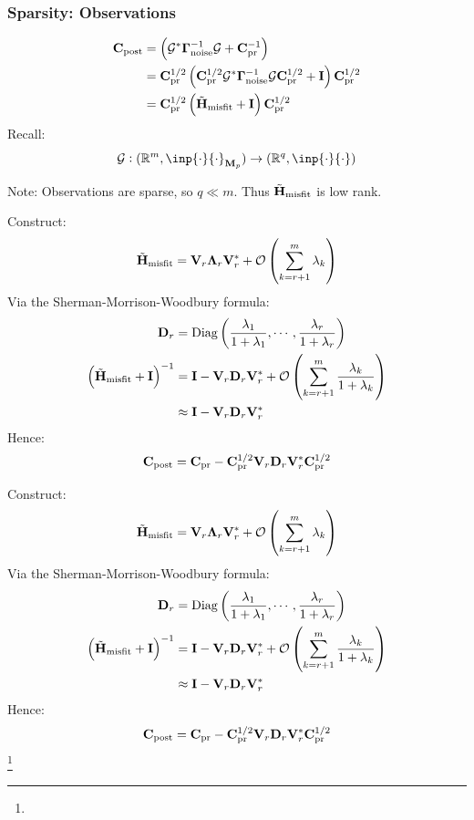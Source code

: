 \documentclass[
  pdf,
  10pt,
  xcolor={svgnames},
]{beamer}
\newcommand\blfootnote[1]{%
  \begingroup
  \renewcommand\thefootnote{}\footnote{\scriptsize #1}%
  \addtocounter{footnote}{-1}%
  \endgroup
}
\newcommand{\mc}[1]{\mathcal{#1}}
\newcommand{\R}{\mathbb{R}}
\newcommand{\mat}[1]{\mathbf{{#1}}}
\begin{document}
\begin{frame}
  \frametitle{Sparsity: Observations}
  \begin{align*}
    \mat{C}_{\rm post}
    &= 
    \left(
      \mc{G}^* \vb{\Gamma}_{\rm noise}^{-1} \mc{G} + \mat{C}_{\rm pr}^{-1}
    \right) \\
    &=
    \mat{C}_{\rm pr}^{1/2}
    \left(
      \mat{C}_{\rm pr}^{1/2}
      \mc{G}^* \vb{\Gamma}_{\rm noise}^{-1} \mc{G} 
      \mat{C}_{\rm pr}^{1/2}
      + \mat{I}
    \right) 
    \mat{C}_{\rm pr}^{1/2} \\
    &=
    \mat{C}_{\rm pr}^{1/2}
    \left(
      \tilde{\mat{H}}_{\rm misfit} + \mat{I}
    \right) 
    \mat{C}_{\rm pr}^{1/2}
  \end{align*}
  \pause
  Recall:
  \[
    \mc{G}:
    (\R^m, \inp{\cdot}{\cdot}_{\mat{M}_p}) \to (\R^q, \inp{\cdot}{\cdot})
  \]
  \begin{block}{Note:}
    Observations are sparse, so $q \ll m$. Thus $\tilde{\mat{H}}_{\rm misfit}$ is
    low rank.
  \end{block}
\end{frame}

\begin{frame}
  Construct:
  \[
    \tilde{\mat{H}}_{\rm misfit}
    = \mat{V}_r \mat{\Lambda}_r \mat{V}_r^*
    + \mc{O}\left( \sum_{k=r+1}^m \lambda_k \right)
  \]
  \pause
  Via the Sherman-Morrison-Woodbury formula:
  \begin{align*}
    \mat{D}_r
    &=
    {\rm Diag}\left(
      \frac{\lambda_1}{1+\lambda_1}, \cdots, \frac{\lambda_r}{1+\lambda_r}
    \right) \\
    \left(
      \tilde{\mat{H}}_{\rm misfit} + \mat{I}
    \right)^{-1}
    &= 
    \mat{I} - \mat{V}_r \mat{D}_r \mat{V}_r^*
    + \mc{O}\left( \sum_{k=r+1}^m \frac{\lambda_k}{1+\lambda_k} \right) \\
    &\approx
    \mat{I} - \mat{V}_r \mat{D}_r \mat{V}_r^*
  \end{align*}
  \pause
  Hence:
  \[
    \mat{C}_{\rm post}
    = 
    \mat{C}_{\rm pr} 
    - \mat{C}_{\rm pr}^{1/2} \mat{V}_r \mat{D}_r \mat{V}_r^* \mat{C}_{\rm pr}^{1/2}
  \]
\end{frame}
\begin{frame}
  Construct:
  \[
    \tilde{\mat{H}}_{\rm misfit}
    = \mat{V}_r \mat{\Lambda}_r \mat{V}_r^*
    + \mc{O}\left( \sum_{k=r+1}^m \lambda_k \right)
  \]
  Via the Sherman-Morrison-Woodbury formula:
  \begin{align*}
    \mat{D}_r
    &=
    {\rm Diag}\left(
      \frac{\lambda_1}{1+\lambda_1}, \cdots, \frac{\lambda_r}{1+\lambda_r}
    \right) \\
    \left(
      \tilde{\mat{H}}_{\rm misfit} + \mat{I}
    \right)^{-1}
    &= 
    \mat{I} - \mat{V}_r \mat{D}_r \mat{V}_r^*
    + \mc{O}\left( \sum_{k=r+1}^m \frac{\lambda_k}{1+\lambda_k} \right) \\
    &\approx
    \mat{I} - \mat{V}_r \mat{D}_r \mat{V}_r^*
  \end{align*}
  Hence:
  \[
    \mat{C}_{\rm post}
    = 
    \mat{C}_{\rm pr} 
    - \mat{C}_{\rm pr}^{1/2} \mat{V}_r \mat{D}_r \mat{V}_r^* \mat{C}_{\rm pr}^{1/2}
  \]
  \blfootnote{}
\end{frame}
\end{document}
